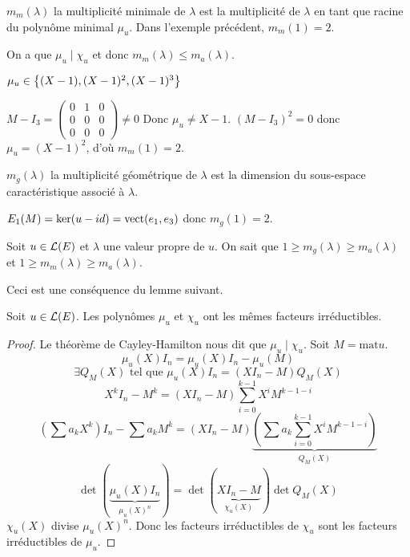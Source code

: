 $m_m(\lambda)$ la multiplicité minimale de $\lambda$ est la multiplicité de $\lambda$ en tant que racine du polynôme minimal $\mu_u$.
Dans l'exemple précédent, $m_m(1) = 2$.

On a que $\mu_u \mid \chi_u$ et donc $m_m(\lambda) \leq m_a(\lambda)$.

$\mu_u \in  \left\{(X-1), (X-1)^2, (X-1)^3\right\}$

$M - I_3 = \begin{pmatrix}
		0 & 1 & 0 \\ 0 & 0 & 0 \\ 0 & 0 & 0
	\end{pmatrix} \neq 0$ Donc $\mu_u \neq X - 1$.
$(M - I_3)^2 = 0$ donc $\mu_u = (X-1)^2$, d'où $m_m(1) = 2$.


$m_g(\lambda)$ la multiplicité géométrique de $\lambda$ est la dimension du sous-espace caractéristique associé à $\lambda$.

$E_1 (M) = \ker (u-id) = \text{vect} (e_1, e_3)$ donc $m_g(1) = 2$.


\begin{prop}
	Soit $u \in \mathcal{L}(E)$ et $\lambda$ une valeur propre de $u$. On sait que $ 1 \geq m_g(\lambda) \geq m_a(\lambda)$ et $1 \geq m_m(\lambda) \geq m_a(\lambda)$.

	Ceci est une conséquence du lemme suivant.
\end{prop}

\begin{lemma}
	Soit $u \in \mathcal{L}(E)$. Les polynômes $\mu_u$ et $\chi_u$ ont les mêmes facteurs irréductibles.
\end{lemma}

\begin{proof}
	Le théorème de Cayley-Hamilton nous dit que $\mu_u \mid \chi_u$. Soit $M = \text {mat} u$.
	$$\mu_u(X)I_n = \mu_u(X)I_n - \mu_u(M)$$
	$$\exists Q_M (X) \text{ tel que } \mu_u(X) I_n = (XI_n-M)Q_M(X)$$
	$$ X^k I_n - M^k = (XI_n - M) \sum_{i=0}^{k-1} X^i M^{k-1-i} $$
	$$ (\sum a_k X^k)I_n - \sum a_k M^k =(XI_n-M)\underbrace{(\sum a_k \sum_{i=0}^{k-1}X^iM^{k-1-i})}_{Q_M(X)}$$
	$$ \det (\underbrace{\mu_u(X) I_n}_{\mu_u(X)^n}) = \det (\underbrace{XI_n-M}_{\chi_u(X)})\det Q_M(X) $$
	$\chi_u(X)$ divise $\mu_u(X)^n$.
	Donc les facteurs irréductibles de $\chi_u$ sont les facteurs irréductibles de $\mu_u$.

\end{proof}








